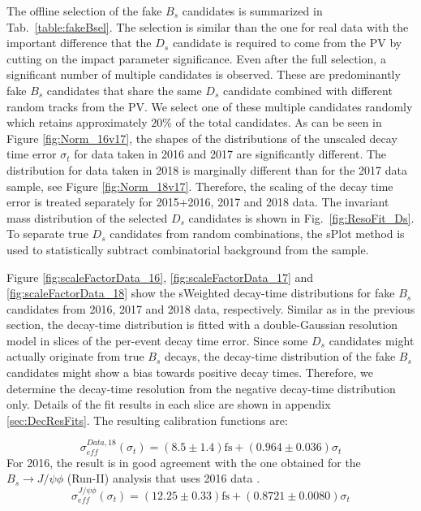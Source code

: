 The offline selection of the fake $B_s$ candidates is summarized in Tab.~\ref{table:fakeBsel}.
The selection is similar than the one for real data with the important difference that the $D_s$ candidate is required to come from the PV by cutting on the impact parameter significance.
Even after the full selection, a significant number of multiple candidates is observed.
These are predominantly fake $B_s$ candidates that share the same $D_s$ candidate combined with different random tracks from the PV.
We select one of these multiple candidates randomly which retains approximately $20\%$ of the total candidates.
As can be seen in Figure \ref{fig:Norm_16v17}, the shapes of the distributions of the unscaled decay time error $\sigma_{t}$ for data taken in 2016 and 2017 are significantly different. 
The distribution for data taken in 2018 is marginally different than for the 2017 data sample, see Figure \ref{fig:Norm_18v17}.
Therefore, the scaling of the decay time error is treated separately for 2015+2016, 2017 and 2018 data.
The invariant mass distribution of the selected $D_s$ candidates is shown in Fig.~\ref{fig:ResoFit_Ds}.
To separate true $D_s$ candidates from random combinations, the \textsf{sPlot} method is used to statistically subtract combinatorial background from the sample.

Figure \ref{fig:scaleFactorData_16}, \ref{fig:scaleFactorData_17} and  \ref{fig:scaleFactorData_18} show the \textsf{sWeighted} decay-time distributions for fake $B_s$ candidates from 2016, 2017 and 2018 data, respectively.
Similar as in the previous section, the decay-time distribution is fitted with a double-Gaussian resolution model in slices of the per-event decay time error.
Since some $D_s$ candidates might actually originate from true $B_s$ decays, the decay-time distribution of the fake $B_s$ candidates 
might show a bias towards positive decay times. 
Therefore, we determine the decay-time resolution from the negative decay-time distribution only.
Details of the fit results in each slice are shown in appendix \ref{sec:DecResFits}. 
The resulting calibration functions are:


\begin{equation}
\sigma_{eff}^{Data,18}(\sigma_t) = \left( 8.5 \pm 1.4 \right) \text{fs} + \left( 0.964 \pm 0.036 \right) \sigma_t
\label{eq:scaleFactorData_18}
\end{equation}
For 2016, the result is in good agreement with the one obtained for the $B_s \to J/\psi \phi$ (Run-II) analysis that uses 2016 data \cite{LHCb-ANA-2017-028}. 
\begin{equation}
\sigma_{eff}^{J/\psi\phi}(\sigma_t) = \left( 12.25 \pm 0.33 \right) \text{fs} + \left( 0.8721 \pm 0.0080 \right) \sigma_t
\label{eq:scaleFactorJpsiPhi}
\end{equation}

